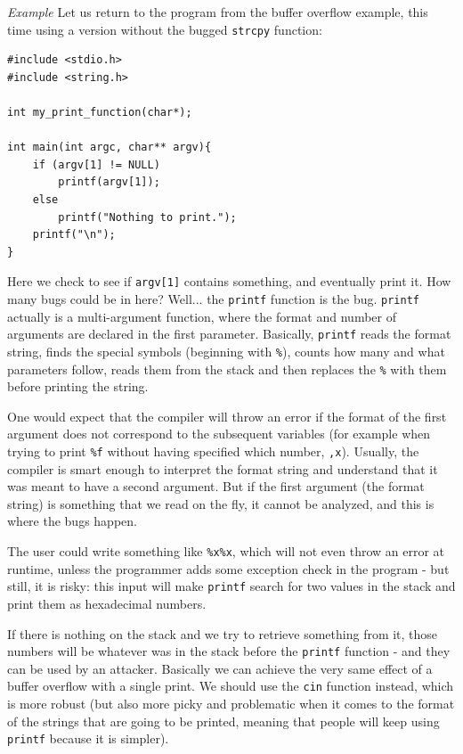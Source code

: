 \vspace{0.5em}

\emph{Example} Let us return to the program from the buffer overflow example, this time using a version without the bugged \texttt{strcpy} function:

\begin{verbatim}
#include <stdio.h>
#include <string.h>

int my_print_function(char*);

int main(int argc, char** argv){
    if (argv[1] != NULL)
        printf(argv[1]);
    else
        printf("Nothing to print.");
    printf("\n");
}
\end{verbatim}

Here we check to see if \texttt{argv[1]} contains something, and eventually print it. How many bugs could be in here? Well... the \texttt{printf} function is the bug. \texttt{printf} actually is a multi-argument function, where the format and number of arguments are declared in the first parameter. Basically, \texttt{printf} reads the format string, finds the special symbols (beginning with \texttt{\%}), counts how many and what parameters follow, reads them from the stack and then replaces the \texttt{\%} with them before printing the string.

One would expect that the compiler will throw an error if the format of the first argument does not correspond to the subsequent variables (for example when trying to print \texttt{\%f} without having specified which number, \texttt{,x}). Usually, the compiler is smart enough to interpret the format string and understand that it was meant to have a second argument. But if the first argument (the format string) is something that we read on the fly, it cannot be analyzed, and this is where the bugs happen.

The user could write something like \texttt{\%x\%x}, which will not even throw an error at runtime, unless the programmer adds some exception check in the program - but still, it is risky: this input will make \texttt{printf} search for two values in the stack and print them as hexadecimal numbers.

If there is nothing on the stack and we try to retrieve something from it, those numbers will be whatever was in the stack before the \texttt{printf} function - and they can be used by an attacker. Basically we can achieve the very same effect of a buffer overflow with a single print. We should use the \texttt{cin} function instead, which is more robust (but also more picky and problematic when it comes to the format of the strings that are going to be printed, meaning that people will keep using \texttt{printf} because it is simpler).

